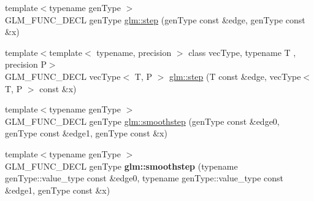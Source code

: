 \begin{DoxyCompactItemize}
\item 
{\footnotesize template$<$typename gen\-Type $>$ }\\G\-L\-M\-\_\-\-F\-U\-N\-C\-\_\-\-D\-E\-C\-L gen\-Type \hyperlink{group__core__func__common_gaf21c84759af7799f573865f70c2f0a86}{glm\-::step} (gen\-Type const \&edge, gen\-Type const \&x)
\item 
{\footnotesize template$<$template$<$ typename, precision $>$ class vec\-Type, typename T , precision P$>$ }\\G\-L\-M\-\_\-\-F\-U\-N\-C\-\_\-\-D\-E\-C\-L vec\-Type$<$ T, P $>$ \hyperlink{group__core__func__common_gae830a682901c0ba63c92a7d201bba007}{glm\-::step} (T const \&edge, vec\-Type$<$ T, P $>$ const \&x)
\item 
{\footnotesize template$<$typename gen\-Type $>$ }\\G\-L\-M\-\_\-\-F\-U\-N\-C\-\_\-\-D\-E\-C\-L gen\-Type \hyperlink{group__core__func__common_ga754103c8d2cdaf40f71429252457c10a}{glm\-::smoothstep} (gen\-Type const \&edge0, gen\-Type const \&edge1, gen\-Type const \&x)
\item 
\hypertarget{group__core__func__common_ga1e7b9e668a0bd2f494a1d49b871a50ea}{{\footnotesize template$<$typename gen\-Type $>$ }\\G\-L\-M\-\_\-\-F\-U\-N\-C\-\_\-\-D\-E\-C\-L gen\-Type {\bfseries glm\-::smoothstep} (typename gen\-Type\-::value\-\_\-type const \&edge0, typename gen\-Type\-::value\-\_\-type const \&edge1, gen\-Type const \&x)}\label{group__core__func__common_ga1e7b9e668a0bd2f494a1d49b871a50ea}


\end{DoxyCompactItemize}
